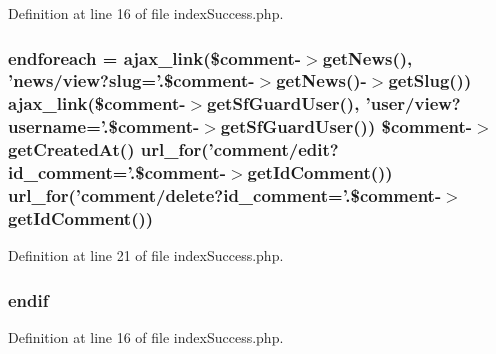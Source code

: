 Definition at line 16 of file index\-Success.\-php.

\hypertarget{backend_2modules_2comment_2templates_2index_success_8php_a672d9707ef91db026c210f98cc601123}{
\subsubsection[{endforeach}]{\setlength{\rightskip}{0pt plus 5cm}endforeach = ajax\-\_\-link(\$comment-\/$>$get\-News(), 'news/view?{\bf slug}='.\$comment-\/$>$get\-News()-\/$>$get\-Slug()) ajax\-\_\-link(\$comment-\/$>$get\-Sf\-Guard\-User(), 'user/view?username='.\$comment-\/$>$get\-Sf\-Guard\-User()) \$comment-\/$>${\bf get\-Created\-At}() url\-\_\-for('comment/edit?id\-\_\-comment='.\$comment-\/$>$get\-Id\-Comment()) url\-\_\-for('comment/delete?id\-\_\-comment='.\$comment-\/$>$get\-Id\-Comment())}}\label{backend_2modules_2comment_2templates_2index_success_8php_a672d9707ef91db026c210f98cc601123}


Definition at line 21 of file index\-Success.\-php.

\hypertarget{backend_2modules_2comment_2templates_2index_success_8php_ab4d017bcc79cd2827c3dce8af2570e91}{
\subsubsection[{endif}]{ endif}}\label{backend_2modules_2comment_2templates_2index_success_8php_ab4d017bcc79cd2827c3dce8af2570e91}


Definition at line 16 of file index\-Success.\-php.

